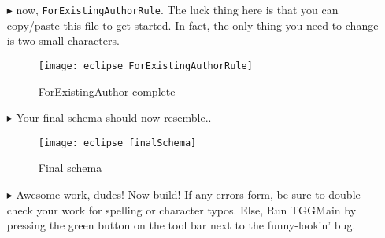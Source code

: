 \begin{itemize}
\item[$\blacktriangleright$] now, \texttt{ForExistingAuthorRule}. The luck thing here is that you can copy/paste this file to get started. In fact, the only
thing you need to change is two small characters.

\begin{figure}[htbp]
\begin{center}
  \texttt{[image: eclipse\_ForExistingAuthorRule]}
  \caption{ForExistingAuthor complete}
  \label{eclipse:ForExistingAuthorRule}
\end{center}
\end{figure}


\item[$\blacktriangleright$] Your final schema should now resemble..

\begin{figure}[htbp]
\begin{center}
  \texttt{[image: eclipse\_finalSchema]}
  \caption{Final schema}
  \label{eclipse:schemaFinal}
\end{center}
\end{figure}

\item[$\blacktriangleright$] Awesome work, dudes! Now build! If any errors form, be sure to double check your work for spelling or character typos. Else, Run
TGGMain by pressing the green button on the tool bar next to the funny-lookin' bug.


\end{itemize}
